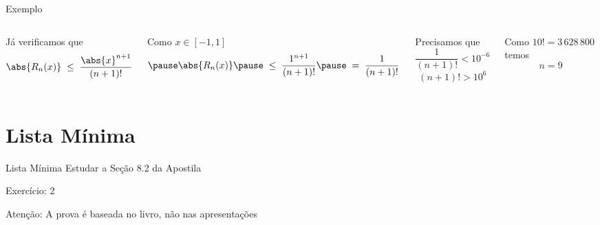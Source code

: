 \documentclass[fleqn,utf8,aspectratio=169,12pt]{beamer}
\begin{document}
\begin{frame}{Exemplo \theexemplo}
\begin{columns}
  Já verificamos que
  \[
    \abs{R_n(x)}
    \;\leq\; \frac{\abs{x}^{n+1}}{(n+1)!}
  \]

  \pause
  \vspace{\baselineskip}
  Como  \(x\in[-1, 1]\)
  \[
    \pause
    \abs{R_n(x)}
    \pause
    \;\leq\; \frac{1^{n+1}}{(n+1)!}
    \pause
    \;=\; \frac{1}{(n+1)!}
  \]

  \pause
  Precisamos que
  \[
    \frac{1}{(n+1)!} < 10^{-6}
  \]
  \[
    (n+1)! > 10^6
  \]

  \pause
  \vspace{\baselineskip}
  Como \(10! = 3\,628\,800\) temos
  \[
    n = 9
  \]
\end{columns}

\end{frame}

\section{Lista Mínima}

\begin{frame}{Lista Mínima}
  Estudar a Seção 8.2 da Apostila

  \vfill
  Exercício: 2

  \vfill
  Atenção: A prova é baseada no livro, não nas apresentações
\end{frame}

\end{document}
